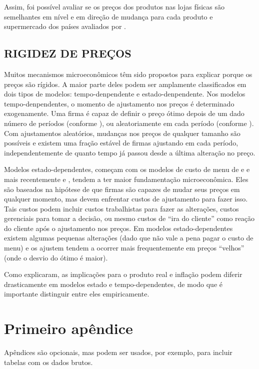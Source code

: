 \documentclass[twoside,a4paper,11pt]{report}
\begin{document}
  Assim, foi possível avaliar se os preços dos produtos nas lojas físicas são semelhantes em nível e em direção de mudança para cada produto e supermercado dos países avaliados por \citet{cavallo2010scraped}.

\section*{RIGIDEZ DE PREÇOS}

Muitos mecanismos microeconômicos têm sido propostos para explicar porque os preços são rígidos. A maior parte deles podem ser amplamente classificados em dois tipos de modelos: tempo-denpendente e estado-denpendente. Nos modelos tempo-denpendentes, o momento de ajustamento nos preços é determinado exogenamente. Uma firma é capaz de definir o preço ótimo depois de um dado número de períodos (conforme \citet{taylor1980aggregate}), ou aleatoriamente em cada período (conforme \citet{calvo1983staggered}). Com ajustamentos aleatórios, mudanças nos preços de qualquer tamanho são possíveis e existem uma fração estável de firmas ajustando em cada período, independentemente de quanto tempo já passou desde a última alteração no preço. 

Modelos estado-dependentes, começam com os modelos de custo de menu de \citet{barro1972theory} e \citet{sheshinski1977inflation} e mais recentemente \citet{dotsey1999state} e \citet{golosov2007menu}, tendem a ter maior fundamentação microeconômica. Eles são baseados na hipótese de que firmas são capazes de mudar seus preços em qualquer momento, mas devem enfrentar custos de ajustamento para fazer isso. Tais custos podem incluir custos trabalhistas para fazer as alterações, custos gerenciais para tomar a decisão, ou mesmo custos de “ira do cliente” como reação do cliente após o ajustamento nos preços. Em modelos estado-dependentes existem algumas pequenas alterações (dado que não vale a pena pagar o custo de menu) e os ajustem tendem a ocorrer mais frequentemente em preços “velhos” (onde o desvio do ótimo é maior).

Como \citet{klenow2008state} explicaram, as implicações para o produto real e inflação podem diferir drasticamente em modelos estado e tempo-dependentes, de modo que é importante distinguir entre eles empiricamente. 








\appendix

\chapter{Primeiro apêndice}\label{ap2}

Apêndices são opcionais, mas podem ser usados, por exemplo, para incluir tabelas com os dados brutos.

\end{document}

